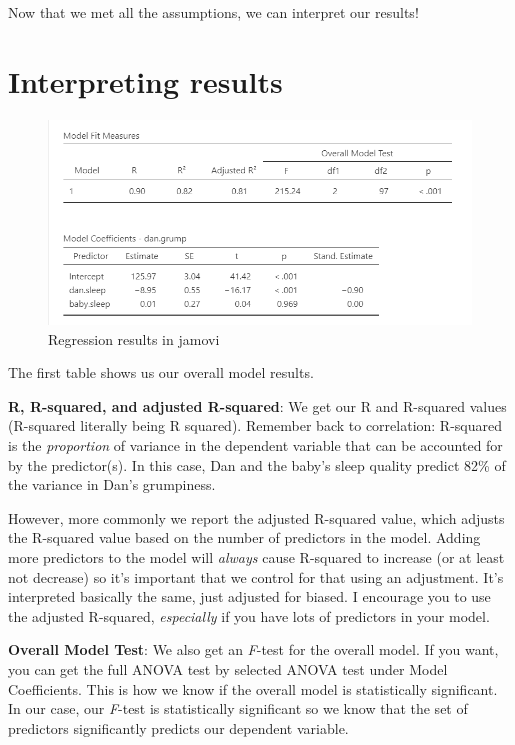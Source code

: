 \documentclass[
]{book}
\begin{document}
Now that we met all the assumptions, we can interpret our results!

\hypertarget{interpreting-results-7}{%
\section{Interpreting results}\label{interpreting-results-7}}

\begin{figure}

{\centering \includegraphics[width=1\linewidth]{images/13-regression/regression-results} 

}

\caption{Regression results in jamovi}\label{fig:unnamed-chunk-11}
\end{figure}

The first table shows us our overall model results.

\textbf{R, R-squared, and adjusted R-squared}: We get our R and R-squared values (R-squared literally being R squared). Remember back to correlation: R-squared is the \emph{proportion} of variance in the dependent variable that can be accounted for by the predictor(s). In this case, Dan and the baby's sleep quality predict 82\% of the variance in Dan's grumpiness.

However, more commonly we report the adjusted R-squared value, which adjusts the R-squared value based on the number of predictors in the model. Adding more predictors to the model will \emph{always} cause R-squared to increase (or at least not decrease) so it's important that we control for that using an adjustment. It's interpreted basically the same, just adjusted for biased. I encourage you to use the adjusted R-squared, \emph{especially} if you have lots of predictors in your model.

\textbf{Overall Model Test}: We also get an \emph{F}-test for the overall model. If you want, you can get the full ANOVA test by selected ANOVA test under Model Coefficients. This is how we know if the overall model is statistically significant. In our case, our \emph{F}-test is statistically significant so we know that the set of predictors significantly predicts our dependent variable.
\end{document}
